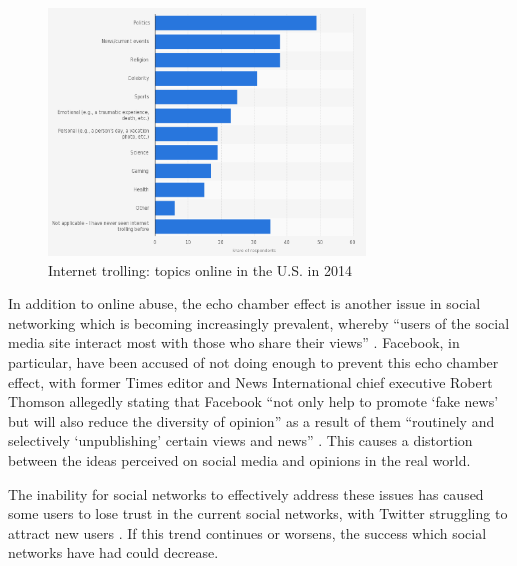 \begin{figure}[H]
  \centering
  \includegraphics[width=0.75\textwidth]{Images/Introduction/TrollingByTopic}
  \caption{Internet trolling: topics online in the U.S. in 2014 \cite{Statista:TrollingByTopic}} \label{fig:TrollingByTopic} 
\end{figure}

In addition to online abuse, the echo chamber effect is another issue in social networking which is becoming increasingly prevalent, whereby ``users of the social media site interact most with those who share their views'' \cite{Jackson:EchoChamber}. Facebook, in particular, have been accused of not doing enough to prevent this echo chamber effect, with former Times editor and News International chief executive Robert Thomson allegedly stating that Facebook ``not only help to promote `fake news' but will also reduce the diversity of opinion'' as a result of them ``routinely and selectively `unpublishing' certain views and news'' \cite{Orlowski:EchoChamber}. This causes a distortion between the ideas perceived on social media and opinions in the real world.

The inability for social networks to effectively address these issues has caused some users to lose trust in the current social networks, with Twitter struggling to attract new users \cite{Barrons:Twitter}. If this trend continues or worsens, the success which social networks have had could decrease.

